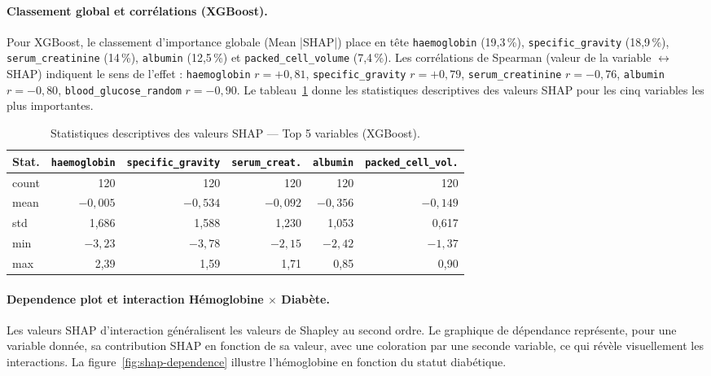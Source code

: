 \paragraph{Classement global et corrélations (XGBoost).}
Pour XGBoost, le classement d'importance globale (Mean |SHAP|) place en tête \texttt{haemoglobin} (19{,}3\,\%), \texttt{specific\_gravity} (18{,}9\,\%), \texttt{serum\_creatinine} (14\,\%), \texttt{albumin} (12{,}5\,\%) et \texttt{packed\_cell\_volume} (7{,}4\,\%). Les corrélations de Spearman (valeur de la variable $\leftrightarrow$ SHAP) indiquent le sens de l'effet : \texttt{haemoglobin} $r = +0{,}81$, \texttt{specific\_gravity} $r = +0{,}79$, \texttt{serum\_creatinine} $r = -0{,}76$, \texttt{albumin} $r = -0{,}80$, \texttt{blood\_glucose\_random} $r = -0{,}90$. Le tableau~\ref{tab:shap-xgb-top5} donne les statistiques descriptives des valeurs SHAP pour les cinq variables les plus importantes.

\begin{table}[H]
\centering
\caption{Statistiques descriptives des valeurs SHAP — Top 5 variables (XGBoost).}
\label{tab:shap-xgb-top5}
\small
\begin{tabular}{lrrrrr}
\hline
\textbf{Stat.} & \texttt{haemoglobin} & \texttt{specific\_gravity} & \texttt{serum\_creat.} & \texttt{albumin} & \texttt{packed\_cell\_vol.} \\
\hline
count & 120 & 120 & 120 & 120 & 120 \\
mean  & $-0{,}005$ & $-0{,}534$ & $-0{,}092$ & $-0{,}356$ & $-0{,}149$ \\
std   & 1{,}686 & 1{,}588 & 1{,}230 & 1{,}053 & 0{,}617 \\
min   & $-3{,}23$ & $-3{,}78$ & $-2{,}15$ & $-2{,}42$ & $-1{,}37$ \\
max   & 2{,}39 & 1{,}59 & 1{,}71 & 0{,}85 & 0{,}90 \\
\hline
\end{tabular}
\end{table}

\paragraph{Dependence plot et interaction Hémoglobine $\times$ Diabète.}
Les valeurs SHAP d'interaction généralisent les valeurs de Shapley au second ordre. Le graphique de dépendance représente, pour une variable donnée, sa contribution SHAP en fonction de sa valeur, avec une coloration par une seconde variable, ce qui révèle visuellement les interactions. La figure~\ref{fig:shap-dependence} illustre l'hémoglobine en fonction du statut diabétique.

